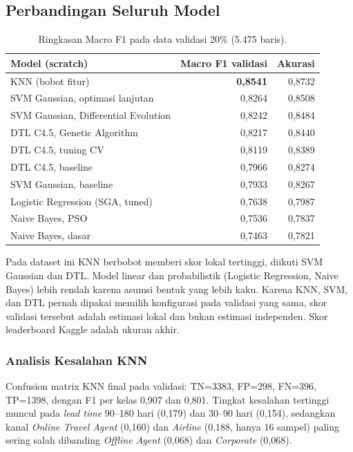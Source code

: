 \documentclass[12pt,a4paper]{article}
\begin{document}
\subsection{Perbandingan Seluruh Model}
\begin{table}[H]\centering\small
\begin{tabular}{lrr}
\toprule
Model (scratch) & Macro F1 validasi & Akurasi\\
\midrule
KNN (bobot fitur) & \textbf{0,8541} & 0,8732\\
SVM Gaussian, optimasi lanjutan & 0,8264 & 0,8508\\
SVM Gaussian, Differential Evolution & 0,8242 & 0,8484\\
DTL C4.5, Genetic Algorithm & 0,8217 & 0,8440\\
DTL C4.5, tuning CV & 0,8119 & 0,8389\\
DTL C4.5, baseline & 0,7966 & 0,8274\\
SVM Gaussian, baseline & 0,7933 & 0,8267\\
Logistic Regression (SGA, tuned) & 0,7638 & 0,7987\\
Naive Bayes, PSO & 0,7536 & 0,7837\\
Naive Bayes, dasar & 0,7463 & 0,7821\\
\bottomrule
\end{tabular}
\caption{Ringkasan Macro F1 pada data validasi 20\% (5.475 baris).}
\end{table}
Pada dataset ini KNN berbobot memberi skor lokal tertinggi, diikuti SVM Gaussian dan DTL. Model linear dan probabilistik (Logistic Regression, Naive Bayes) lebih rendah karena asumsi bentuk yang lebih kaku. Karena KNN, SVM, dan DTL pernah dipakai memilih konfigurasi pada validasi yang sama, skor validasi tersebut adalah estimasi lokal dan bukan estimasi independen. Skor leaderboard Kaggle adalah ukuran akhir.

\subsubsection{Analisis Kesalahan KNN}
Confusion matrix KNN final pada validasi: TN=3383, FP=298, FN=396, TP=1398, dengan F1 per kelas 0,907 dan 0,801. Tingkat kesalahan tertinggi muncul pada \textit{lead time} 90--180 hari (0,179) dan 30--90 hari (0,154), sedangkan kanal \textit{Online Travel Agent} (0,160) dan \textit{Airline} (0,188, hanya 16 sampel) paling sering salah dibanding \textit{Offline Agent} (0,068) dan \textit{Corporate} (0,068).
\end{document}
